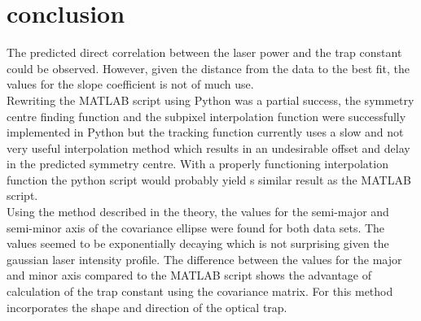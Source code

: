 \section{conclusion}
The predicted direct correlation between the laser power and the trap constant could be observed. However, given the distance from the data to the best fit, the values for the slope coefficient is not of much use.\\
Rewriting the MATLAB script using Python was a partial success, the symmetry centre finding function and the subpixel interpolation function were successfully implemented in Python but the tracking function currently uses a slow and not very useful interpolation method which results in an undesirable offset and delay in the predicted symmetry centre. With a properly functioning interpolation function the python script would probably yield s similar result as the MATLAB script.\\
Using the method described in the theory, the values for the semi-major and semi-minor axis of the covariance ellipse were found for both data sets. The values seemed to be exponentially decaying which is not surprising given the gaussian laser intensity profile. The difference between the values for the major and minor axis compared to the MATLAB script shows the advantage of calculation of the trap constant using the covariance matrix. For this method incorporates the shape and direction of the optical trap.\\

\begin{comment}

\vspace{-0.5cm}
\begin{table}[h!]
    \centering
    \begin{tabular}{|l|l|l|l|}
        \hline
        coefficient for & $a_x$ {[}$pN/(nm\cdot mW)${]} & $a_y$ {[}$pN/(nm \cdot mW)${]} & $a_{tot}$ {[}$pN/(nm \cdot mW)${]} \\ \hline
        dataset 1       & $1.382\cdot 10^{-6}$          & $1.280 \cdot 10^{-6}$          & $1.740 \cdot 10^{-4}$              \\ \hline
        dataset 2       & $1.478 \cdot 10^{-5}$         & $3.974 \cdot 10^{-6}$          & $1.551 \cdot 10^{-5}$              \\ \hline
    \end{tabular}
    \caption{The results of the linear fits for the trap stiffness as a function of laser output power. The shown $a$-factors satisfy the least squares fit of the function: $k_i = a_i \cdot P$ }
\end{table}

\end{comment}